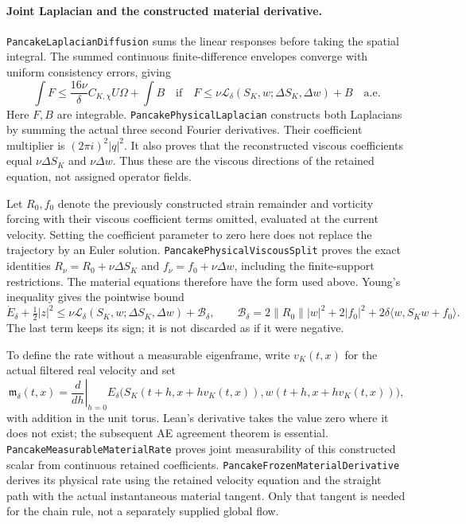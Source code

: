 \documentclass[11pt]{article}
\theoremstyle{definition}
\begin{document}
\paragraph{Joint Laplacian and the constructed material derivative.}
\texttt{PancakeLaplacianDiffusion} sums the linear responses before taking
the spatial integral. The summed continuous finite-difference envelopes
converge with uniform consistency errors, giving
\[
 \int F\le\frac{16\nu}{\delta}C_{K,\chi}U\Omega+\int B
 \quad\text{if}\quad
 F\le\nu\mathcal L_\delta(S_K,w;\Delta S_K,\Delta w)+B
 \quad\text{a.e.}
\]
Here $F,B$ are integrable. \texttt{PancakePhysicalLaplacian} constructs
both Laplacians by summing the actual three second Fourier derivatives.
Their coefficient multiplier is $(2\pi i)^2|q|^2$. It also proves that
the reconstructed viscous coefficients equal $\nu\Delta S_K$ and
$\nu\Delta w$. Thus these are the viscous directions of the retained
equation, not assigned operator fields.

Let $R_0,f_0$ denote the previously constructed strain remainder and
vorticity forcing with their viscous coefficient terms omitted, evaluated
at the current velocity. Setting the coefficient parameter to zero here
does not replace the trajectory by an Euler solution.
\texttt{PancakePhysicalViscousSplit} proves the exact identities
$R_\nu=R_0+\nu\Delta S_K$ and
$f_\nu=f_0+\nu\Delta w$, including the finite-support restrictions.
The material equations therefore have the form used above.
Young's inequality gives the pointwise bound
\[
 \dot E_\delta+\tfrac12|z|^2
 \le \nu\mathcal L_\delta(S_K,w;\Delta S_K,\Delta w)
       +\mathcal B_\delta,
 \qquad
 \mathcal B_\delta=2\|R_0\||w|^2+2|f_0|^2
                       +2\delta\langle w,S_Kw+f_0\rangle.
\]
The last term keeps its sign; it is not discarded as if it were negative.

To define the rate without a measurable eigenframe, write $v_K(t,x)$
for the actual filtered real velocity and set
\[
 \mathfrak m_\delta(t,x)=
 \left.\frac{d}{dh}\right|_{h=0}
 E_\delta\bigl(S_K(t+h,x+h v_K(t,x)),
                       w(t+h,x+h v_K(t,x))\bigr),
\]
with addition in the unit torus. Lean's derivative takes the value zero
where it does not exist; the subsequent AE agreement theorem is essential.
\texttt{PancakeMeasurableMaterialRate} proves joint measurability of this
constructed scalar from continuous retained coefficients.
\texttt{PancakeFrozenMaterialDerivative} derives its physical rate using
the retained velocity equation and the straight path with the actual
instantaneous material tangent. Only that tangent is needed for the
chain rule, not a separately supplied global flow.
\end{document}
